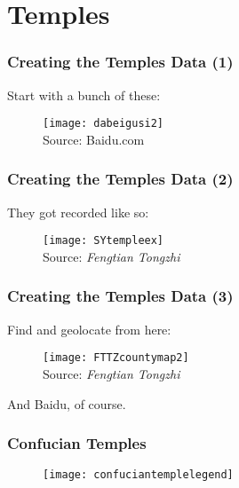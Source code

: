 \section{Temples}

\begin{frame}[label = temples]
\frametitle{Creating the Temples Data (1)  \hyperlink{data2}{}}
Start with a bunch of these:
\begin{figure}[h!]
\texttt{[image: dabeigusi2]}\\
{\tiny Source: Baidu.com}

\end{figure}

\end{frame}

\begin{frame}[label = temples2]
\frametitle{Creating the Temples Data (2)  \hyperlink{data2}{}}
They got recorded like so:
\begin{figure}[h!]
\texttt{[image: SYtempleex]}\\
{\tiny Source: \emph{Fengtian Tongzhi}}

\end{figure}

\end{frame}

\begin{frame}[label = temples3]
\frametitle{Creating the Temples Data (3)  \hyperlink{data2}{}}
Find and geolocate from here:
\begin{figure}[h!]
\texttt{[image: FTTZcountymap2]}\\
{\tiny Source: \emph{Fengtian Tongzhi}}
\end{figure}
And Baidu, of course.

\end{frame}



\begin{frame}[label=confucianlegend]
\frametitle{Confucian Temples \hyperlink{templeculture}{} \hyperlink{data2}{}}
\begin{figure}[h!]
\texttt{[image: confuciantemplelegend]}\\
\end{figure}
\end{frame}





